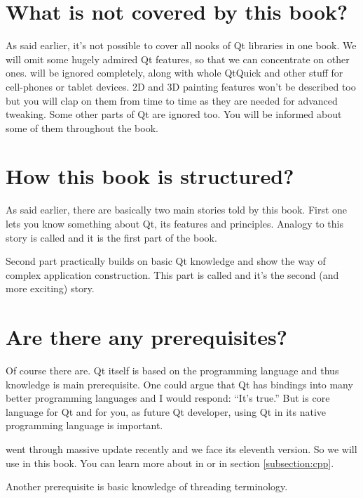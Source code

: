 
\section*{What is not covered by this book?}
As said earlier, it's not possible to cover all nooks of Qt libraries in one book. We will omit some hugely admired Qt features, so that we can concentrate on other ones.  will be ignored completely, along with whole QtQuick and other stuff for cell-phones or tablet devices. 2D and 3D painting features won't be described too but you will clap on them from time to time as they are needed for advanced  tweaking. Some other parts of Qt are ignored too. You will be informed about some of them throughout the book.

\section*{How this book is structured?}
As said earlier, there are basically two main stories told by this book. First one lets you know something about Qt, its features and principles. Analogy to this story is called  and it is the first part of the book.

Second part practically builds on basic Qt knowledge and show the way of complex application construction. This part is called  and it's the second (and more exciting) story.

\section*{Are there any prerequisites?}
Of course there are. Qt itself is based on the \cpp programming language and thus \cpp knowledge is main prerequisite. One could argue that Qt has bindings into many better programming languages and I would respond: \enquote{It's true.} But \cpp is core language for Qt and for you, as future Qt developer, using Qt in its native programming language is important.

\cpp went through massive update recently and we face its eleventh version. So we will use  in this book. You can learn more about  in \citep{various:cppstandard} or in section \ref{subsection:cpp}.

Another prerequisite is basic knowledge of threading terminology.

